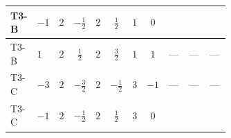 \documentclass[8pt]{article}
\begin{document}
\begin{landscape}
\begin{longtable}{@{}llcccccc >{\raggedright\arraybackslash}p{0.21\linewidth} >{\raggedright\arraybackslash}p{0.21\linewidth} >{\raggedright\arraybackslash}p{0.21\linewidth}@{}}
T3-B & $-1$ & $2$ & $-\frac{1}{2}$ & $2$ & $\frac{1}{2}$ & $1$ & $0$ & \scriptsize\adjustbox{max width=\linewidth}{$\begin{gathered} {\lambda_{HS_1}^{(1)}} \left(\frac{1}{2} \operatorname{Tr}\!\left({y_2}\,\left({y_1}\right)^{\dagger}\right)+4 {\lambda_{H H^\dagger S_1^\dagger S_2^\dagger}^{\rm Cross}}+3 {\lambda_{11}}\right)\end{gathered}$} & \scriptsize\adjustbox{max width=\linewidth}{$\begin{gathered} +{\lambda_{HS_1}^{(A)}} \left(-\frac{1}{8} \operatorname{Tr}\!\left({y_2}\,\left({y_1}\right)^{\dagger}\right)-\frac{{\lambda_{H H^\dagger S_1^\dagger S_2^\dagger}^{\rm Cross}}}{2}-\frac{{\lambda_{11}}}{4}\right)\end{gathered}$} & \scriptsize\adjustbox{max width=\linewidth}{$\begin{gathered} +{\lambda_{HS_2}^{(1)}} \left(\frac{1}{2} \operatorname{Tr}\!\left({y_2}\,\left({y_1}\right)^{\dagger}\right)+4 {\lambda_{H H^\dagger S_1^\dagger S_2^\dagger}^{\rm Cross}}+3 {\lambda_{10}}\right)\end{gathered}$} \\
\midrule
T3-B & $1$ & $2$ & $\frac{1}{2}$ & $2$ & $\frac{3}{2}$ & $1$ & $1$ & --- & --- & --- \\
\midrule
T3-C & $-3$ & $2$ & $-\frac{3}{2}$ & $2$ & $-\frac{1}{2}$ & $3$ & $-1$ & --- & --- & --- \\
\midrule
T3-C & $-1$ & $2$ & $-\frac{1}{2}$ & $2$ & $\frac{1}{2}$ & $3$ & $0$ & \scriptsize\adjustbox{max width=\linewidth}{$\begin{gathered} {\lambda_{HS_1}^{(1)}} \left(\frac{3}{4} \operatorname{Tr}\!\left({y_2}\,\left({y_1}\right)^{\dagger}\right)+4 {\lambda_{H H^\dagger S_1^\dagger S_2^\dagger}^{\rm Cross}}+3 {\lambda_{11}}\right)\end{gathered}$} & \scriptsize\adjustbox{max width=\linewidth}{$\begin{gathered} +{\lambda_{HS_1}^{(A)}} \left(-\frac{3}{16} \operatorname{Tr}\!\left({y_2}\,\left({y_1}\right)^{\dagger}\right)-\frac{{\lambda_{H H^\dagger S_1^\dagger S_2^\dagger}^{\rm Cross}}}{2}-\frac{{\lambda_{11}}}{4}\right)\end{gathered}$} & \scriptsize\adjustbox{max width=\linewidth}{$\begin{gathered} +{\lambda_{HS_2}^{(1)}} \left(\frac{3}{4} \operatorname{Tr}\!\left({y_2}\,\left({y_1}\right)^{\dagger}\right)+4 {\lambda_{H H^\dagger S_1^\dagger S_2^\dagger}^{\rm Cross}}+3 {\lambda_{10}}\right)\end{gathered}$} \\

\end{longtable}
\end{landscape}
\end{document}
